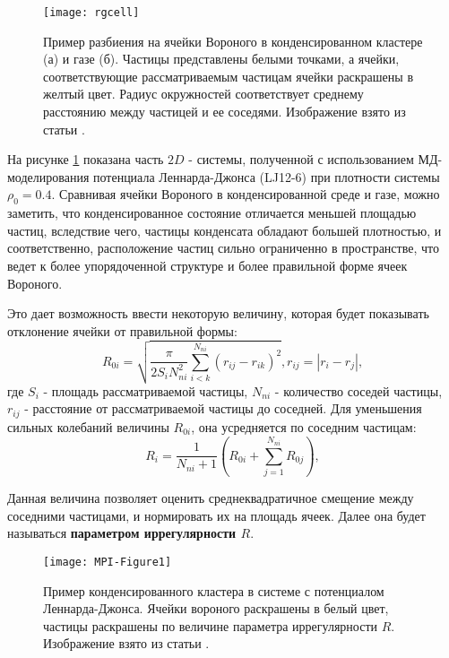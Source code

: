\begin{figure}[h]
\begin{center}
\texttt{[image: rgcell]}
\caption{Пример разбиения на ячейки Вороного в конденсированном кластере (а) и газе (б). Частицы представлены белыми точками, а ячейки, соответствующие рассматриваемым частицам ячейки раскрашены в желтый цвет. Радиус окружностей соответствует среднему расстоянию между частицей и ее соседями. Изображение взято из статьи \cite{Ovcharov2017}.}
\label{risFlucMed}
\end{center}
\end{figure}

На рисунке \ref{risFlucMed} показана часть $2D$ - системы, полученной с использованием МД-моделирования потенциала Леннарда-Джонса (LJ12-6) при плотности системы $\rho_0 = 0.4$.
Сравнивая ячейки Вороного в конденсированной среде и газе, можно заметить, что конденсированное состояние отличается меньшей площадью частиц, вследствие чего, частицы конденсата обладают большей плотностью, и соответственно, расположение частиц сильно ограниченно в пространстве, что ведет к более упорядоченной структуре и более правильной форме ячеек Вороного.

Это дает возможность ввести некоторую величину, которая будет показывать отклонение ячейки от правильной формы:
\begin{equation}
	R_{0i} = \sqrt{\frac{\pi}{2 S_i N_{ni}^2} \sum\limits_{i<k}^{N_{ni}} (r_{ij} - r_{ik})^2}, r_{ij} = |r_i - r_j|,
\end{equation}
где $S_i$ - площадь рассматриваемой частицы, $N_{ni}$ - количество соседей частицы, $r_{ij}$ - расстояние от рассматриваемой частицы до соседней.
Для уменьшения сильных колебаний величины $R_{0i}$, она усредняется по соседним частицам:
\begin{equation}\label{eqIrreg}
R_i = \frac{1}{N_{ni} + 1} \left( R_{0i} + \sum\limits_{j=1}^{N_{ni}} R_{0j} \right),
\end{equation}

Данная величина позволяет оценить среднеквадратичное смещение между соседними частицами, и нормировать их на площадь ячеек.
Далее она будет называться \textbf{параметром иррегулярности $R$}.

\begin{figure}[h]
\begin{center}
\texttt{[image: MPI-Figure1]}
\caption{Пример конденсированного кластера в системе с потенциалом Леннарда-Джонса. Ячейки вороного раскрашены в белый цвет, частицы раскрашены по величине параметра иррегулярности $R$. Изображение взято из статьи \cite{Ovcharov2017}.}
\label{risIrreg}
\end{center}
\end{figure}

